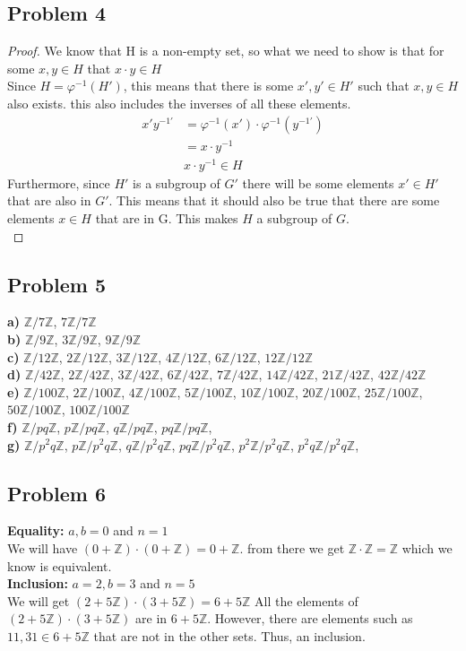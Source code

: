 \documentclass[12pt]{article}
\newcommand{\Z}{\mathbb{Z}}
\begin{document}
\subsection*{Problem 4}
\begin{proof}
We know that H is a non-empty set, so what we need to show is that for some $x,y \in H$ that $x \cdot y \in H$\\
Since $H = \varphi^{-1}(H')$, this means that there is some $x',y' \in H'$ such that $x,y \in H$ also exists. this also includes the inverses of all these elements.\\
\begin{align*}
x'y^{-1'} &= \varphi^{-1}(x') \cdot \varphi^{-1}(y^{-1'})\\
&= x \cdot y^{-1} \\
& x \cdot y ^{-1} \in H
\end{align*}
Furthermore, since $H'$ is a subgroup of $G'$ there will be some elements $x' \in H'$ that are also in $G'$. This means that it should also be true that there are some elements $x \in H$ that are in G. This makes $H$ a subgroup of $G$. \\
\end{proof}
\subsection*{Problem 5}
\textbf{a) }$\Z / 7\Z$, $7\Z / 7\Z$\\
\textbf{b) }$\Z / 9\Z$, $3\Z / 9\Z$, $9\Z / 9\Z$\\
\textbf{c) }$\Z / 12\Z$, $2\Z / 12\Z$, $3\Z / 12\Z$, $4\Z / 12\Z$, $6\Z / 12\Z$, $12\Z / 12\Z$\\
\textbf{d) }$\Z / 42\Z$, $2\Z / 42\Z$, $3\Z / 42\Z$, $6\Z / 42\Z$, $7\Z / 42\Z$, $14\Z / 42\Z$, $21\Z / 42\Z$, $42\Z / 42\Z$\\
\textbf{e) }$\Z / 100\Z$, $2\Z / 100\Z$, $4\Z / 100\Z$, $5\Z / 100\Z$, $10\Z / 100\Z$, $20\Z / 100\Z$, $25\Z / 100\Z$, $50\Z / 100\Z$, $100\Z / 100\Z$\\
\textbf{f) }$\Z / pq\Z$, $p\Z / pq\Z$, $q\Z / pq\Z$, $pq\Z / pq\Z$, \\
\textbf{g) }$\Z / p^2q\Z$, $p\Z / p^2q\Z$, $q\Z / p^2q\Z$, $pq\Z / p^2q\Z$, $p^2\Z / p^2q\Z$, $p^2q\Z / p^2q\Z$, \\
\subsection*{Problem 6}
\textbf{Equality: } $a,b = 0$ and $n = 1$\\
 We will have $(0 + \Z) \cdot (0 + \Z) = 0 + \Z$. from there we get $\Z \cdot \Z = \Z$ which we know is equivalent.\\
\textbf{Inclusion: } $a=2, b=3$ and $n = 5$\\
We will get $(2 + 5\Z) \cdot (3 + 5\Z) = 6 + 5\Z$ All the elements of $(2 + 5\Z) \cdot (3 + 5\Z)$ are in $6 + 5\Z$. However, there are elements such as $11, 31 \in 6 + 5\Z$ that are not in the other sets. Thus, an inclusion.
\end{document}

